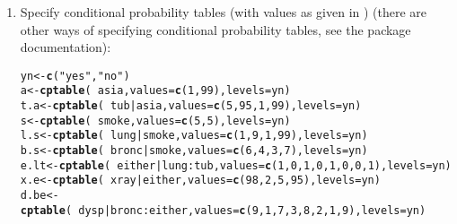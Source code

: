 \documentclass[10pt]{article}\usepackage[]{graphicx}\usepackage[]{color}
\makeatletter
\newcommand{\hlnum}[1]{\textcolor[rgb]{0.686,0.059,0.569}{#1}}%
\newcommand{\hlstr}[1]{\textcolor[rgb]{0.192,0.494,0.8}{#1}}%
\newcommand{\hlopt}[1]{\textcolor[rgb]{0,0,0}{#1}}%
\newcommand{\hlstd}[1]{\textcolor[rgb]{0.345,0.345,0.345}{#1}}%
\newcommand{\hlkwb}[1]{\textcolor[rgb]{0.69,0.353,0.396}{#1}}%
\newcommand{\hlkwc}[1]{\textcolor[rgb]{0.333,0.667,0.333}{#1}}%
\newcommand{\hlkwd}[1]{\textcolor[rgb]{0.737,0.353,0.396}{\textbf{#1}}}%
\newenvironment{kframe}{%
 \def\at@end@of@kframe{}%
 \ifinner\ifhmode%
  \def\at@end@of@kframe{\end{minipage}}%
  \begin{minipage}{\columnwidth}%
 \fi\fi%
 \def\FrameCommand##1{\hskip\@totalleftmargin \hskip-\fboxsep
 \colorbox{shadecolor}{##1}\hskip-\fboxsep
     \hskip-\linewidth \hskip-\@totalleftmargin \hskip\columnwidth}%
 \MakeFramed {\advance\hsize-\width
   \@totalleftmargin\z@ \linewidth\hsize
   \@setminipage}}%
 {\par\unskip\endMakeFramed%
 \at@end@of@kframe}
\newenvironment{knitrout}{}{} %
\makeatother
\begin{document}
\begin{enumerate}
\item Specify conditional probability tables (with values as given in
  \cite{lau/spieg:88}) (there are other ways of specifying conditional
  probability tables, see the package documentation):

\begin{knitrout}
\color{fgcolor}\begin{kframe}
\begin{alltt}
\hlstd{yn} \hlkwb{<-} \hlkwd{c}\hlstd{(}\hlstr{"yes"}\hlstd{,} \hlstr{"no"}\hlstd{)}
\hlstd{a}    \hlkwb{<-} \hlkwd{cptable}\hlstd{(}\hlopt{~}\hlstd{asia,} \hlkwc{values}\hlstd{=}\hlkwd{c}\hlstd{(}\hlnum{1}\hlstd{,} \hlnum{99}\hlstd{),} \hlkwc{levels}\hlstd{=yn)}
\hlstd{t.a}  \hlkwb{<-} \hlkwd{cptable}\hlstd{(}\hlopt{~}\hlstd{tub}\hlopt{|}\hlstd{asia,} \hlkwc{values}\hlstd{=}\hlkwd{c}\hlstd{(}\hlnum{5}\hlstd{,} \hlnum{95}\hlstd{,} \hlnum{1}\hlstd{,} \hlnum{99}\hlstd{),} \hlkwc{levels}\hlstd{=yn)}
\hlstd{s}    \hlkwb{<-} \hlkwd{cptable}\hlstd{(}\hlopt{~}\hlstd{smoke,} \hlkwc{values}\hlstd{=}\hlkwd{c}\hlstd{(}\hlnum{5}\hlstd{,} \hlnum{5}\hlstd{),} \hlkwc{levels}\hlstd{=yn)}
\hlstd{l.s}  \hlkwb{<-} \hlkwd{cptable}\hlstd{(}\hlopt{~}\hlstd{lung}\hlopt{|}\hlstd{smoke,} \hlkwc{values}\hlstd{=}\hlkwd{c}\hlstd{(}\hlnum{1}\hlstd{,} \hlnum{9}\hlstd{,} \hlnum{1}\hlstd{,} \hlnum{99}\hlstd{),} \hlkwc{levels}\hlstd{=yn)}
\hlstd{b.s}  \hlkwb{<-} \hlkwd{cptable}\hlstd{(}\hlopt{~}\hlstd{bronc}\hlopt{|}\hlstd{smoke,} \hlkwc{values}\hlstd{=}\hlkwd{c}\hlstd{(}\hlnum{6}\hlstd{,} \hlnum{4}\hlstd{,} \hlnum{3}\hlstd{,} \hlnum{7}\hlstd{),} \hlkwc{levels}\hlstd{=yn)}
\hlstd{e.lt} \hlkwb{<-} \hlkwd{cptable}\hlstd{(}\hlopt{~}\hlstd{either}\hlopt{|}\hlstd{lung}\hlopt{:}\hlstd{tub,} \hlkwc{values}\hlstd{=}\hlkwd{c}\hlstd{(}\hlnum{1}\hlstd{,} \hlnum{0}\hlstd{,} \hlnum{1}\hlstd{,} \hlnum{0}\hlstd{,} \hlnum{1}\hlstd{,} \hlnum{0}\hlstd{,} \hlnum{0}\hlstd{,} \hlnum{1}\hlstd{),} \hlkwc{levels}\hlstd{=yn)}
\hlstd{x.e}  \hlkwb{<-} \hlkwd{cptable}\hlstd{(}\hlopt{~}\hlstd{xray}\hlopt{|}\hlstd{either,} \hlkwc{values}\hlstd{=}\hlkwd{c}\hlstd{(}\hlnum{98}\hlstd{,} \hlnum{2}\hlstd{,} \hlnum{5}\hlstd{,} \hlnum{95}\hlstd{),} \hlkwc{levels}\hlstd{=yn)}
\hlstd{d.be} \hlkwb{<-} \hlkwd{cptable}\hlstd{(}\hlopt{~}\hlstd{dysp}\hlopt{|}\hlstd{bronc}\hlopt{:}\hlstd{either,} \hlkwc{values}\hlstd{=}\hlkwd{c}\hlstd{(}\hlnum{9}\hlstd{,} \hlnum{1}\hlstd{,} \hlnum{7}\hlstd{,} \hlnum{3}\hlstd{,} \hlnum{8}\hlstd{,} \hlnum{2}\hlstd{,} \hlnum{1}\hlstd{,} \hlnum{9}\hlstd{),} \hlkwc{levels}\hlstd{=yn)}
\end{alltt}
\end{kframe}
\end{knitrout}


\end{enumerate}
\end{document}
